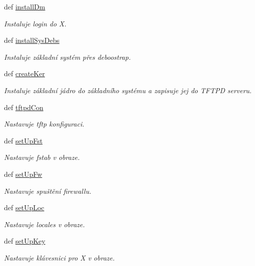 \begin{DoxyCompactItemize}
def \hyperlink{classConfSys_1_1ConfSys_acc9747fb9c27ec9b502f05f8e9038e93}{install\-Dm}
\begin{DoxyCompactList}\small\item\em Instaluje login do X. \end{DoxyCompactList}\item 
def \hyperlink{classConfSys_1_1ConfSys_a25b558cfd4ac44f9f75d82771079db7a}{install\-Sys\-Debs}
\begin{DoxyCompactList}\small\item\em Instaluje základní systém přes deboostrap. \end{DoxyCompactList}\item 
def \hyperlink{classConfSys_1_1ConfSys_a8b17a236bdf36c53b109b0d30add20a3}{create\-Ker}
\begin{DoxyCompactList}\small\item\em Instaluje základní jádro do základního systému a zapisuje jej do T\-F\-T\-P\-D serveru. \end{DoxyCompactList}\item 
def \hyperlink{classConfSys_1_1ConfSys_a7fcacef3719a4eefbb116cd91df1846f}{tftpd\-Con}
\begin{DoxyCompactList}\small\item\em Nastavuje tftp konfiguraci. \end{DoxyCompactList}\item 
def \hyperlink{classConfSys_1_1ConfSys_ab30f940b6063d918726bf098a1572dbd}{set\-Up\-Fst}
\begin{DoxyCompactList}\small\item\em Nastavuje fstab v obraze. \end{DoxyCompactList}\item 
def \hyperlink{classConfSys_1_1ConfSys_a8494e0b1d538ef981c3670e065bbfe78}{set\-Up\-Fw}
\begin{DoxyCompactList}\small\item\em Nastavuje spuštění firewallu. \end{DoxyCompactList}\item 
def \hyperlink{classConfSys_1_1ConfSys_ad2121d426e037b6ad07d747231fe6370}{set\-Up\-Loc}
\begin{DoxyCompactList}\small\item\em Nastavuje locales v obraze. \end{DoxyCompactList}\item 
def \hyperlink{classConfSys_1_1ConfSys_a6cd13575cfed138a3fa2fdeecc567000}{set\-Up\-Key}
\begin{DoxyCompactList}\small\item\em Nastavuje klávesnici pro X v obraze. \end{DoxyCompactList}\item 

\end{DoxyCompactItemize}
